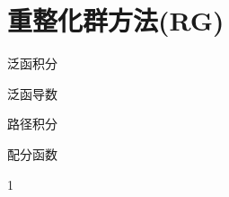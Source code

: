 \ifx\allfiles\undefined



	\else
	\fi
	
\chapter{重整化群方法(RG)}
\begin{introduction}
	\item 泛函积分
	\item 泛函导数
	\item 路径积分
	\item 配分函数
\end{introduction}
1
	
	
	
	
\ifx\allfiles\undefined

	\else
	\fi

